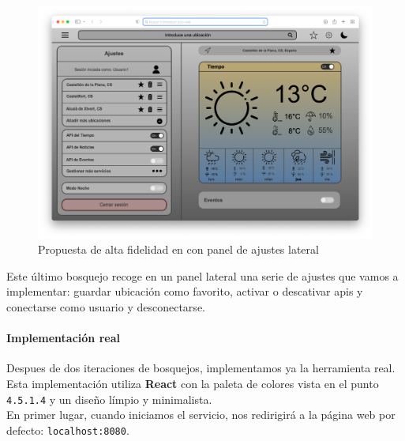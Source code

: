 \documentclass[../ei103948-project-documentation.tex]{subfiles}
\begin{document}
                                \vspace*{-5mm}
                                \begin{figure}[H]
                                    \begin{center}
                                        \hspace*{-8mm}
                                    \includegraphics[scale=0.867]{images/Boceto4.png}
                                    \end{center}
                                    \caption{Propuesta de alta fidelidad en con panel de ajustes lateral}
                                \end{figure}

                                Este último bosquejo recoge en un panel lateral una serie de ajustes que vamos a implementar: guardar ubicación como favorito, activar o descativar apis y conectarse como usuario y desconectarse.\\

                                \paragraph{Implementación real}

                                Despues de dos iteraciones de bosquejos, implementamos ya la herramienta real. Esta implementación utiliza \textbf{React} con la paleta de colores vista en el punto \texttt{4.5.1.4} y un diseño límpio y minimalista.\\

                                En primer lugar, cuando iniciamos el servicio, nos redirigirá a la página web por defecto: \texttt{localhost:8080}.\\
\end{document}
